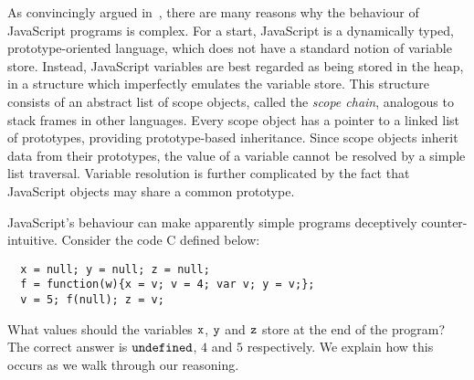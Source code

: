\documentclass{article}
\begin{document}
As convincingly argued in~\cite{MMT-APLAS-TR08,Guha2010,Richards2010,Vitek-Eval}, there are many reasons why
the behaviour of JavaScript programs is complex.
%
For a start, JavaScript is a dynamically typed, prototype-oriented
language, which does not have a standard notion of variable store.
Instead, JavaScript variables are best regarded  as being stored in the
heap, in a structure which imperfectly emulates the variable store. This structure consists of an
abstract list of scope objects, called the {\em scope chain}, analogous to stack frames in other
languages. Every scope object has a pointer to a linked list of
prototypes, providing prototype-based inheritance. Since scope objects
inherit data from their prototypes, the value of a variable cannot be
resolved by a simple list traversal. Variable resolution is further
complicated by the fact that JavaScript objects may share a common
prototype.

JavaScript's behaviour can make apparently simple programs deceptively
counter-intuitive. Consider the code \js C defined below:
%
\begin{verbatim}
  x = null; y = null; z = null;
  f = function(w){x = v; v = 4; var v; y = v;};
  v = 5; f(null); z = v; 
\end{verbatim}
%                
%
What values should the variables $\mbox{\texttt{{\upshape x}}}$, $\mbox{\texttt{{\upshape y}}}$ and $\mbox{\texttt{{\upshape z}}}$ store at the end of the program? The correct answer is $\mbox{\texttt{{\upshape undefined}}}$, $4$ and $5$  respectively. We explain how this occurs as we walk through our reasoning.

\end{document}
